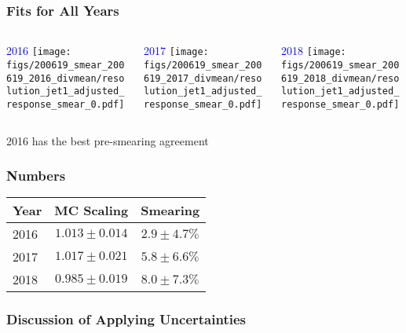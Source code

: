 \documentclass{beamer}
\begin{document}
\begin{frame}
  \frametitle{Fits for All Years}

  \begin{columns}
    \begin{column}{0.33\linewidth}
      \centering
      \textcolor{blue}{2016}
      \texttt{[image: figs/200619\_smear\_200619\_2016\_divmean/resolution\_jet1\_adjusted\_response\_smear\_0.pdf]}
    \end{column}
    \begin{column}{0.34\linewidth}
      \centering
      \textcolor{blue}{2017}
      \texttt{[image: figs/200619\_smear\_200619\_2017\_divmean/resolution\_jet1\_adjusted\_response\_smear\_0.pdf]}
    \end{column}
    \begin{column}{0.33\linewidth}
      \centering
      \textcolor{blue}{2018}
      \texttt{[image: figs/200619\_smear\_200619\_2018\_divmean/resolution\_jet1\_adjusted\_response\_smear\_0.pdf]}
    \end{column}
  \end{columns}

  \vfill
  2016 has the best pre-smearing agreement

\end{frame}


\begin{frame}
  \frametitle{Numbers}

  \vfill
  \begin{center}
    \begin{tabular}{|l|c|c|}
      \hline
      Year & MC Scaling & Smearing \\
      \hline
      2016 & $1.013 \pm 0.014$ & $2.9 \pm 4.7 \%$ \\
      2017 & $1.017 \pm 0.021$ & $5.8 \pm 6.6 \%$ \\
      2018 & $0.985 \pm 0.019$ & $8.0 \pm 7.3 \%$ \\
      \hline
    \end{tabular}
  \end{center}

\end{frame}


\begin{frame}
  \frametitle{Discussion of Applying Uncertainties}

\end{frame}
\end{document}
